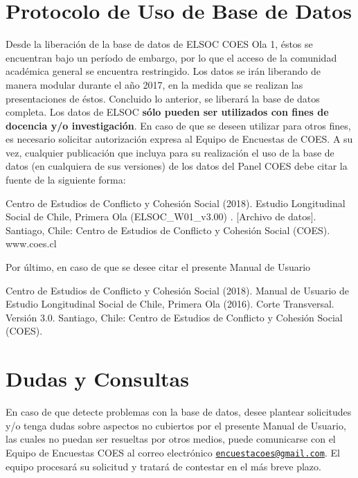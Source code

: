 \documentclass[
]{book}
\begin{document}
\hypertarget{protocolo-de-uso-de-base-de-datos}{%
\chapter{Protocolo de Uso de Base de Datos}\label{protocolo-de-uso-de-base-de-datos}}

Desde la liberación de la base de datos de ELSOC COES Ola 1, éstos se encuentran bajo un período de embargo, por lo que el acceso de la comunidad académica general se encuentra restringido. Los datos se irán liberando de manera modular durante el año 2017, en la medida que se realizan las presentaciones de éstos. Concluido lo anterior, se liberará la base de datos completa. Los datos de ELSOC \textbf{sólo pueden ser utilizados con fines de docencia y/o investigación}. En caso de que se deseen utilizar para otros fines, es necesario solicitar autorización expresa al Equipo de Encuestas de COES. A su vez, cualquier publicación que incluya para su realización el uso de la base de datos (en cualquiera de sus versiones) de los datos del Panel COES debe citar la fuente de la siguiente forma:

Centro de Estudios de Conflicto y Cohesión Social (2018). Estudio Longitudinal Social de Chile, Primera Ola (ELSOC\_W01\_v3.00) . {[}Archivo de datos{]}. Santiago, Chile: Centro de Estudios de Conflicto y Cohesión Social (COES). www.coes.cl

Por último, en caso de que se desee citar el presente Manual de Usuario

Centro de Estudios de Conflicto y Cohesión Social (2018). Manual de Usuario de Estudio Longitudinal Social de Chile, Primera Ola (2016). Corte Transversal. Versión 3.0. Santiago, Chile: Centro de Estudios de Conflicto y Cohesión Social (COES).

\hypertarget{dudas-y-consultas}{%
\chapter{Dudas y Consultas}\label{dudas-y-consultas}}

En caso de que detecte problemas con la base de datos, desee plantear solicitudes y/o tenga dudas sobre aspectos no cubiertos por el presente Manual de Usuario, las cuales no puedan ser resueltas por otros medios, puede comunicarse con el Equipo de Encuestas COES al correo electrónico \href{mailto:encuestacoes@gmail.com}{\nolinkurl{encuestacoes@gmail.com}}. El equipo procesará su solicitud y tratará de contestar en el más breve plazo.
\end{document}
